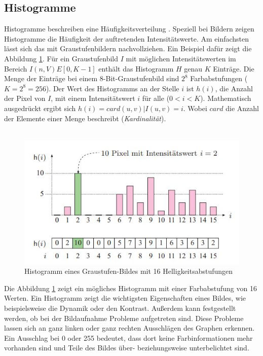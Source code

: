 \subsection{Histogramme}\label{s.histogramme}
Histogramme beschreiben eine Häufigkeitsverteilung \cite[42ff.]{burger2009digitale}. Speziell bei Bildern zeigen Histogramme die Häufigkeit der auftretenden Intensitätswerte. Am einfachsten lässt sich das mit Graustufenbildern nachvollziehen. Ein Beispiel dafür zeigt die Abbildung \ref{img:histogramm}. Für ein Graustufenbild $I$ mit möglichen Intensitätswerten im Bereich $I(n,V)E[0,K-1]$ enthält das Histogramm $H$ genau $K$ Einträge. Die Menge der Einträge bei einem 8-Bit-Graustufenbild sind $2^8$ Farbabstufungen ($K=2^8=256$). Der Wert des Histogramms an der Stelle $i$ ist $h(i)$, die Anzahl der Pixel von $I$, mit einem Intensitätswert $i$ für alle ($0<i<K$). Mathematisch ausgedrückt ergibt sich
 $h(i)=card{(u,v) | I(u,v)=i}$. %
 Wobei $card$ die Anzahl der Elemente einer Menge beschreibt (\textit{Kardinalität}).\\\\
  \begin{figure}
    [h]
    \centering
    \includegraphics[scale=0.8]{Sources/histogramm.jpg}
    \caption{Histogramm eines Graustufen-Bildes mit 16 Helligkeitsabstufungen \cite[42]{burger2009digitale}}
    \label{img:histogramm}
  \end{figure}
Die Abbildung \ref{img:histogramm} zeigt ein mögliches Histogramm mit einer Farbabstufung von 16 Werten. Ein Histogramm zeigt die wichtigsten Eigenschaften eines Bildes, wie beispielsweise die Dynamik oder den Kontrast. Außerdem kann festgestellt werden, ob bei der Bildaufnahme Probleme aufgetreten sind. Diese Probleme lassen sich an ganz linken oder ganz rechten Ausschlägen des Graphen erkennen. Ein Ausschlag bei 0 oder 255 bedeutet, dass dort keine Farbinformationen mehr vorhanden sind und Teile des Bildes über- beziehungsweise unterbelichtet sind.\\\\
